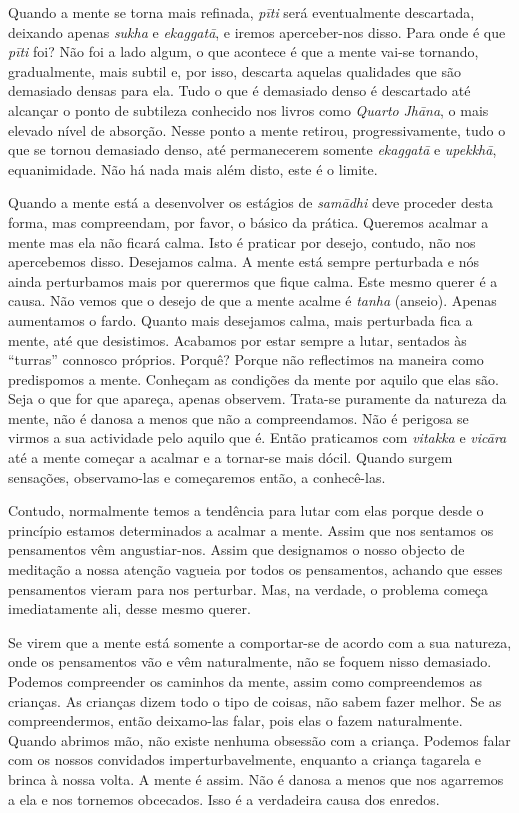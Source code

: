 Quando a mente se torna mais refinada, \emph{pīti} será eventualmente
descartada, deixando apenas \emph{sukha} e \emph{ekaggatā}, e iremos
aperceber-nos disso. Para onde é que \emph{pīti} foi? Não foi a lado
algum, o que acontece é que a mente vai-se tornando, gradualmente, mais
subtil e, por isso, descarta aquelas qualidades que são demasiado densas
para ela. Tudo o que é demasiado denso é descartado até alcançar o ponto
de subtileza conhecido nos livros como \emph{Quarto} \emph{Jhāna}, o
mais elevado nível de absorção. Nesse ponto a mente retirou,
progressivamente, tudo o que se tornou demasiado denso, até permanecerem
somente \emph{ekaggatā} e \emph{upekkhā}, equanimidade. Não há nada mais
além disto, este é o limite.

Quando a mente está a desenvolver os estágios de \emph{samādhi} deve
proceder desta forma, mas compreendam, por favor, o básico da prática.
Queremos acalmar a mente mas ela não ficará calma. Isto é praticar por
desejo, contudo, não nos apercebemos disso. Desejamos calma. A mente
está sempre perturbada e nós ainda perturbamos mais por querermos que
fique calma. Este mesmo querer é a causa. Não vemos que o desejo de que
a mente acalme é \emph{tanha} (anseio). Apenas aumentamos o fardo.
Quanto mais desejamos calma, mais perturbada fica a mente, até que
desistimos. Acabamos por estar sempre a lutar, sentados às ``turras''
connosco próprios. Porquê? Porque não reflectimos na maneira como
predispomos a mente. Conheçam as condições da mente por aquilo que elas
são. Seja o que for que apareça, apenas observem. Trata-se puramente da
natureza da mente, não é danosa a menos que não a compreendamos. Não é
perigosa se virmos a sua actividade pelo aquilo que é. Então praticamos
com \emph{vitakka} e \emph{vicāra} até a mente começar a acalmar e a
tornar-se mais dócil. Quando surgem sensações, observamo-las e
começaremos então, a conhecê-las.

Contudo, normalmente temos a tendência para lutar com elas porque desde
o princípio estamos determinados a acalmar a mente. Assim que nos
sentamos os pensamentos vêm angustiar-nos. Assim que designamos o nosso
objecto de meditação a nossa atenção vagueia por todos os pensamentos,
achando que esses pensamentos vieram para nos perturbar. Mas, na
verdade, o problema começa imediatamente ali, desse mesmo querer.

Se virem que a mente está somente a comportar-se de acordo com a sua
natureza, onde os pensamentos vão e vêm naturalmente, não se foquem
nisso demasiado. Podemos compreender os caminhos da mente, assim como
compreendemos as crianças. As crianças dizem todo o tipo de coisas, não
sabem fazer melhor. Se as compreendermos, então deixamo-las falar, pois
elas o fazem naturalmente. Quando abrimos mão, não existe nenhuma
obsessão com a criança. Podemos falar com os nossos convidados
imperturbavelmente, enquanto a criança tagarela e brinca à nossa volta.
A mente é assim. Não é danosa a menos que nos agarremos a ela e nos
tornemos obcecados. Isso é a verdadeira causa dos enredos.

